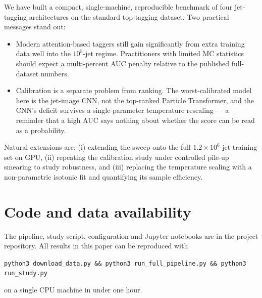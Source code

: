 \documentclass[11pt,a4paper]{article}
\begin{document}
We have built a compact, single-machine, reproducible benchmark of
four jet-tagging architectures on the standard top-tagging dataset.
Two practical messages stand out:
\begin{itemize}
    \item Modern attention-based taggers still gain significantly
          from extra training data well into the
          $10^5$-jet regime.  Practitioners with limited MC
          statistics should expect a multi-percent AUC penalty
          relative to the published full-dataset numbers.
    \item Calibration is a separate problem from ranking.  The
          worst-calibrated model here is the jet-image CNN, not the
          top-ranked Particle Transformer, and the CNN's deficit
          survives a single-parameter temperature rescaling --- a
          reminder that a high AUC says nothing about whether the
          score can be read as a probability.
\end{itemize}

Natural extensions are: (i) extending the sweep onto the full
$1.2\!\times\!10^6$-jet training set on GPU, (ii) repeating the
calibration study under controlled pile-up smearing to study
robustness, and (iii) replacing the temperature scaling with a
non-parametric isotonic fit and quantifying its sample efficiency.

\section*{Code and data availability}

The pipeline, study script, configuration and Jupyter notebooks are
in the project repository.  All results in this paper can be
reproduced with
\begin{center}
\texttt{python3 download\_data.py \&\& python3 run\_full\_pipeline.py
\&\& python3 run\_study.py}
\end{center}
on a single CPU machine in under one hour.
\end{document}
